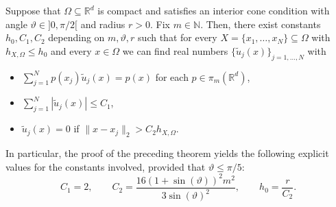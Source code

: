 \documentclass{drna}
\begin{document}
\begin{theorem}
	Suppose that $\Omega \subseteq \mathbb{R}^d$ is compact and satisfies an interior cone condition with angle $\vartheta \in ]0,\pi/2[$ and radius $r>0$. Fix $m \in \mathbb{N}$. Then, there exist constants $h_0, C_1, C_2$ depending on $m, \vartheta,r$ such that for every $X=\{x_1, \dots, x_N\} \subseteq \Omega$ with $h_{X,\Omega} \leq h_0$ and every $x \in \Omega$ we can find real numbers $\{\widetilde{u}_j(x)\}_{j=1,\dots,N}$ with
	\begin{itemize}
		\item $\displaystyle \sum_{j=1}^{N} p(x_j)\widetilde{u}_j(x) = p(x)$ for each $p \in \pi_{m}(\mathbb{R}^d)$,
		\item $\displaystyle \sum_{j=1}^{N} |\widetilde{u}_j(x)| \leq C_1$,
		\item $\widetilde{u}_j(x)=0$ if $\|x-x_j\|_2 > C_2 h_{X,\Omega}$.
	\end{itemize}
 \label{thm_constant_lpr}
\end{theorem}
\noindent In particular, the proof of the preceding theorem yields the following explicit values for the constants involved, provided that $\vartheta \leq \pi/5$:
\begin{equation*}
	C_1 = 2, \qquad C_2 = \frac{16(1+\sin(\vartheta))^2m^2}{3\sin(\vartheta)^2}, \qquad h_0 = \frac{r}{C_2}.
\end{equation*}
\end{document}
